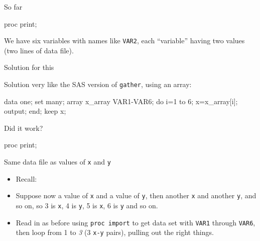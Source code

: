 \documentclass[unknownkeysallowed]{beamer}\usepackage[]{graphicx}\usepackage[]{color}
\begin{document}
\begin{frame}[fragile]{So far}
  
  \begin{Sascode}[store=ma]
proc print;    
  \end{Sascode}
  

We have six variables with names like \texttt{VAR2}, each ``variable''
having two values (two lines of data file).

  
\end{frame}


\begin{frame}[fragile]{Solution for this}

  Solution very like the SAS version of \texttt{gather}, using an array:

  \begin{Datastep}
data one;
  set many;
  array x_array VAR1-VAR6;
  do i=1 to 6;
    x=x_array[i];
    output;
  end;
  keep x;
  \end{Datastep}

\end{frame}

\begin{frame}[fragile]{Did it work?}
    
    \begin{Sascode}[store=mb]
proc print;      
    \end{Sascode}
    
    
\end{frame}

\begin{frame}[fragile]{Same data file as values of \texttt{x} and \texttt{y}}
  
  \begin{itemize}
  \item   Recall:
  

\item Suppose now a value of \texttt{x} and a value of \texttt{y}, then
another \texttt{x} and another \texttt{y}, and so on, so 3 is
\texttt{x}, 4 is \texttt{y}, 5 is \texttt{x}, 6 is \texttt{y} and so on.

\item Read in as before using \texttt{proc import} to get data set
  with \texttt{VAR1} through \texttt{VAR6}, then loop from 1 to
  \emph{3} (3 \texttt{x-y} pairs), pulling out the right things.
  \end{itemize}

  
\end{frame}
\end{document}
